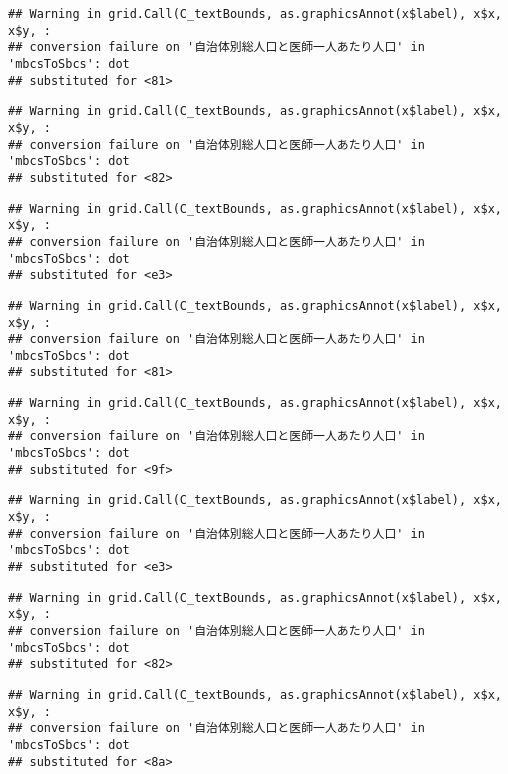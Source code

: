\documentclass[
]{article}
\begin{document}
\begin{verbatim}
## Warning in grid.Call(C_textBounds, as.graphicsAnnot(x$label), x$x, x$y, :
## conversion failure on '自治体別総人口と医師一人あたり人口' in 'mbcsToSbcs': dot
## substituted for <81>
\end{verbatim}

\begin{verbatim}
## Warning in grid.Call(C_textBounds, as.graphicsAnnot(x$label), x$x, x$y, :
## conversion failure on '自治体別総人口と医師一人あたり人口' in 'mbcsToSbcs': dot
## substituted for <82>
\end{verbatim}

\begin{verbatim}
## Warning in grid.Call(C_textBounds, as.graphicsAnnot(x$label), x$x, x$y, :
## conversion failure on '自治体別総人口と医師一人あたり人口' in 'mbcsToSbcs': dot
## substituted for <e3>
\end{verbatim}

\begin{verbatim}
## Warning in grid.Call(C_textBounds, as.graphicsAnnot(x$label), x$x, x$y, :
## conversion failure on '自治体別総人口と医師一人あたり人口' in 'mbcsToSbcs': dot
## substituted for <81>
\end{verbatim}

\begin{verbatim}
## Warning in grid.Call(C_textBounds, as.graphicsAnnot(x$label), x$x, x$y, :
## conversion failure on '自治体別総人口と医師一人あたり人口' in 'mbcsToSbcs': dot
## substituted for <9f>
\end{verbatim}

\begin{verbatim}
## Warning in grid.Call(C_textBounds, as.graphicsAnnot(x$label), x$x, x$y, :
## conversion failure on '自治体別総人口と医師一人あたり人口' in 'mbcsToSbcs': dot
## substituted for <e3>
\end{verbatim}

\begin{verbatim}
## Warning in grid.Call(C_textBounds, as.graphicsAnnot(x$label), x$x, x$y, :
## conversion failure on '自治体別総人口と医師一人あたり人口' in 'mbcsToSbcs': dot
## substituted for <82>
\end{verbatim}

\begin{verbatim}
## Warning in grid.Call(C_textBounds, as.graphicsAnnot(x$label), x$x, x$y, :
## conversion failure on '自治体別総人口と医師一人あたり人口' in 'mbcsToSbcs': dot
## substituted for <8a>
\end{verbatim}
\end{document}
